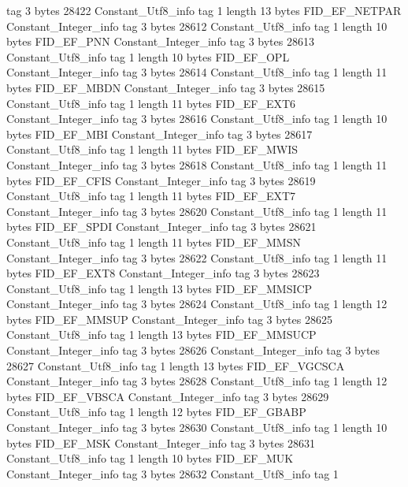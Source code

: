 {{{			tag	3
			bytes	28422
		}
		Constant_Utf8_info {
			tag	1
			length	13
			bytes	FID_EF_NETPAR
		}
		Constant_Integer_info {
			tag	3
			bytes	28612
		}
		Constant_Utf8_info {
			tag	1
			length	10
			bytes	FID_EF_PNN
		}
		Constant_Integer_info {
			tag	3
			bytes	28613
		}
		Constant_Utf8_info {
			tag	1
			length	10
			bytes	FID_EF_OPL
		}
		Constant_Integer_info {
			tag	3
			bytes	28614
		}
		Constant_Utf8_info {
			tag	1
			length	11
			bytes	FID_EF_MBDN
		}
		Constant_Integer_info {
			tag	3
			bytes	28615
		}
		Constant_Utf8_info {
			tag	1
			length	11
			bytes	FID_EF_EXT6
		}
		Constant_Integer_info {
			tag	3
			bytes	28616
		}
		Constant_Utf8_info {
			tag	1
			length	10
			bytes	FID_EF_MBI
		}
		Constant_Integer_info {
			tag	3
			bytes	28617
		}
		Constant_Utf8_info {
			tag	1
			length	11
			bytes	FID_EF_MWIS
		}
		Constant_Integer_info {
			tag	3
			bytes	28618
		}
		Constant_Utf8_info {
			tag	1
			length	11
			bytes	FID_EF_CFIS
		}
		Constant_Integer_info {
			tag	3
			bytes	28619
		}
		Constant_Utf8_info {
			tag	1
			length	11
			bytes	FID_EF_EXT7
		}
		Constant_Integer_info {
			tag	3
			bytes	28620
		}
		Constant_Utf8_info {
			tag	1
			length	11
			bytes	FID_EF_SPDI
		}
		Constant_Integer_info {
			tag	3
			bytes	28621
		}
		Constant_Utf8_info {
			tag	1
			length	11
			bytes	FID_EF_MMSN
		}
		Constant_Integer_info {
			tag	3
			bytes	28622
		}
		Constant_Utf8_info {
			tag	1
			length	11
			bytes	FID_EF_EXT8
		}
		Constant_Integer_info {
			tag	3
			bytes	28623
		}
		Constant_Utf8_info {
			tag	1
			length	13
			bytes	FID_EF_MMSICP
		}
		Constant_Integer_info {
			tag	3
			bytes	28624
		}
		Constant_Utf8_info {
			tag	1
			length	12
			bytes	FID_EF_MMSUP
		}
		Constant_Integer_info {
			tag	3
			bytes	28625
		}
		Constant_Utf8_info {
			tag	1
			length	13
			bytes	FID_EF_MMSUCP
		}
		Constant_Integer_info {
			tag	3
			bytes	28626
		}
		Constant_Integer_info {
			tag	3
			bytes	28627
		}
		Constant_Utf8_info {
			tag	1
			length	13
			bytes	FID_EF_VGCSCA
		}
		Constant_Integer_info {
			tag	3
			bytes	28628
		}
		Constant_Utf8_info {
			tag	1
			length	12
			bytes	FID_EF_VBSCA
		}
		Constant_Integer_info {
			tag	3
			bytes	28629
		}
		Constant_Utf8_info {
			tag	1
			length	12
			bytes	FID_EF_GBABP
		}
		Constant_Integer_info {
			tag	3
			bytes	28630
		}
		Constant_Utf8_info {
			tag	1
			length	10
			bytes	FID_EF_MSK
		}
		Constant_Integer_info {
			tag	3
			bytes	28631
		}
		Constant_Utf8_info {
			tag	1
			length	10
			bytes	FID_EF_MUK
		}
		Constant_Integer_info {
			tag	3
			bytes	28632
		}
		Constant_Utf8_info {
			tag	1
}}}
